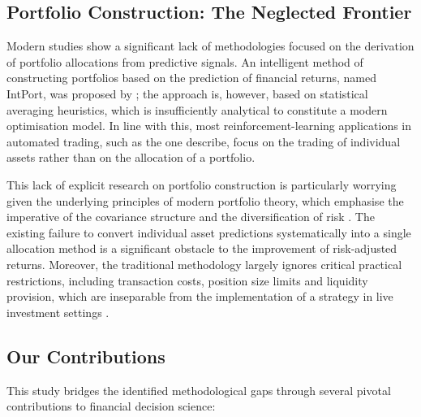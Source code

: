 \documentclass{singlecol-new}
\theoremstyle{TH}{
\newtheorem{lemma}{Lemma}
\newtheorem{theorem}[lemma]{Theorem}
\newtheorem{corrolary}[lemma]{Corrolary}
\newtheorem{conjecture}[lemma]{Conjecture}
\newtheorem{proposition}[lemma]{Proposition}
\newtheorem{claim}[lemma]{Claim}
\newtheorem{stheorem}[lemma]{Wrong Theorem}
\newtheorem{algorithm}{Algorithm}
}
\theoremstyle{THrm}{
\newtheorem{definition}{Definition}[section]
\newtheorem{question}{Question}[section]
\newtheorem{remark}{Remark}
\newtheorem{scheme}{Scheme}
}
\theoremstyle{THhit}{
\newtheorem{case}{Case}[section]
}
\begin{document}
\subsection{Portfolio Construction: The Neglected Frontier}

Modern studies show a significant lack of methodologies focused on the derivation of
portfolio allocations from predictive signals. An intelligent method of constructing
portfolios based on the prediction of financial returns, named IntPort, was proposed by
\citet{sami25}; the approach is, however, based on statistical averaging heuristics,
which is insufficiently analytical to constitute a modern optimisation model. In line
with this, most reinforcement-learning applications in automated trading, such as the one
\citet{kabbani22} describe, focus on the trading of individual assets rather than on the
allocation of a portfolio.

This lack of explicit research on portfolio construction is particularly worrying given
the underlying principles of modern portfolio theory, which emphasise the imperative of
the covariance structure and the diversification of risk \citep{markowitz52}. The
existing failure to convert individual asset predictions systematically into a single
allocation method is a significant obstacle to the improvement of risk-adjusted returns.
Moreover, the traditional methodology largely ignores critical practical restrictions,
including transaction costs, position size limits and liquidity provision, which are
inseparable from the implementation of a strategy in live investment settings
\citep{demiguel09}.

\subsection{Our Contributions}

This study bridges the identified methodological gaps through several pivotal
contributions to financial decision science:
\end{document}
